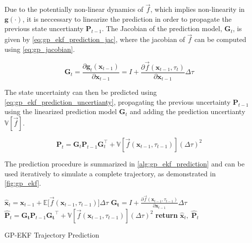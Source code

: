 Due to the potentially non-linear dynamics of $\vec{f}$, which implies non-linearity in $\boldsymbol{g}(\cdot)$, it is neccessary to linearize the prediction in order to propagate the previous state uncertianty $\boldsymbol{P}_{t-1}$. The Jacobian of the prediction model, $\boldsymbol{G}_t$, is given by \cref{eq:gp_ekf_prediction_jac}, where the jacobian of $\vec{f}$ can be computed using \cref{eq:gp_jacobian}.

\begin{equation}\label{eq:gp_ekf_prediction_jac}
    \boldsymbol{G}_t = \frac{\partial \boldsymbol{g}_t(\boldsymbol{x}_{t-1})}{\partial \boldsymbol{x}_{t-1}} = I + \frac{\partial \vec{f}(\boldsymbol{x}_{t-1}, \tau_t)}{\partial \boldsymbol{x}_{t-1}} \Delta \tau
\end{equation}



The state uncertainty can then be predicted using \cref{eq:gp_ekf_prediction_uncertianty}, propagating the previous uncertainty $\boldsymbol{P}_{t-1}$ using the linearized prediction model $\boldsymbol{G}_t$ and adding the prediction uncertianty $\mathbb{V}[\vec{f}]$.

\begin{equation}\label{eq:gp_ekf_prediction_uncertianty}
    \boldsymbol{P}_t = \boldsymbol{G}_t \boldsymbol{P}_{t-1} \boldsymbol{G}_t^\intercal + \mathbb{V}[\vec{f}(\boldsymbol{x}_{t-1}, \tau_{t-1})] (\Delta \tau)^2
\end{equation}

The prediction procedure is summarized in \cref{alg:gp_ekf_prediction} and can be used iteratively to simulate a complete trajectory, as demonstrated in \cref{fig:gp_ekf}.

\begin{algorithm}[h]
    \begin{algorithmic}[1]
        \State $\hat{\boldsymbol{x}}_{t} = \boldsymbol{x}_{t-1} + \mathbb{E}\big[\vec{f}(\boldsymbol{x}_{t-1}, \tau_{t-1})\big] \Delta \tau$
        \State $\boldsymbol{G_t} = I + \frac{\partial \vec{f}(\boldsymbol{x}_{t-1}, \tau_{t-1})}{\partial \boldsymbol{x}_{t-1}} \Delta \tau$
        \State $\hat{\boldsymbol{P}}_t = \boldsymbol{G_t} \boldsymbol{P}_{t-1} \boldsymbol{G_t}^\intercal +\mathbb{V}[\vec{f}(\boldsymbol{x}_{t-1}, \tau_{t-1})] (\Delta \tau)^2$
        \State \textbf{return} $\hat{\boldsymbol{x}}_t, \; \hat{\boldsymbol{P}}_t$
        \EndProcedure
    \end{algorithmic}
    \caption{GP-EKF Trajectory Prediction}
    \label{alg:gp_ekf_prediction}
\end{algorithm}

